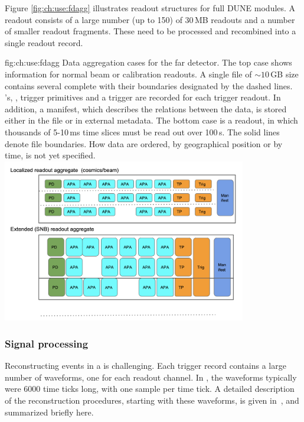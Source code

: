 \documentclass[../main-v1.tex]{subfiles}
\begin{document}
Figure \ref{fig:ch:use:fdagg} illustrates  readout structures for full DUNE  modules.  A readout consists of a large number (up to 150) of   30\,MB  readouts and a number of smaller readout fragments.  These need to be processed and  recombined into a single readout record. 

\begin{dunefigure}
{fig:ch:use:fdagg}
{Data aggregation cases for the far detector. The top case shows information for normal beam or calibration readouts. A single file of $\sim 10$\,GB size contains several complete  with their boundaries designated by the dashed lines.   's, ,  trigger primitives and a trigger  are recorded for each trigger readout.  In addition, a manifest, which describes the relations between the data, is stored either in the file or in external metadata.  The bottom case is a  readout, in which thousands of 5-10\,ms time slices must be read out over 100\,s.  The solid lines denote file boundaries. How data are ordered, by geographical position or by time,    is not  yet specified.}
\includegraphics[width=0.8\textwidth]{graphics/IntroFigures/DataAggregation.png}
\end{dunefigure}

\subsubsection{Signal processing }

Reconstructing events in a  is challenging.  Each trigger record contains a large number of waveforms, one for each readout channel.  In , the waveforms typically were 6000 time ticks long, with one  sample per time tick.  A detailed description of the reconstruction procedures, starting with these waveforms, is given in~\cite{Abi:2020mwi}, and summarized briefly here.
\end{document}
